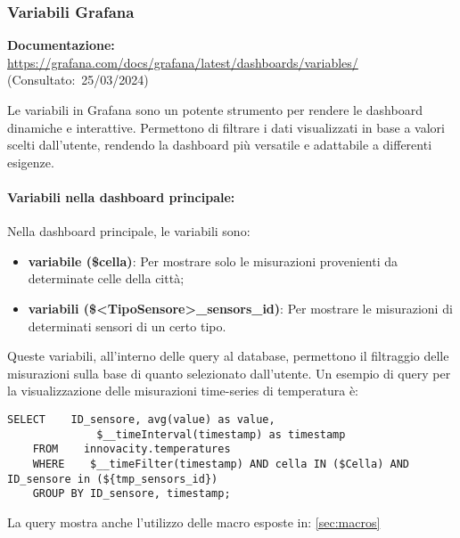 \subsubsection{Variabili Grafana}
\textbf{Documentazione:}
\url{https://grafana.com/docs/grafana/latest/dashboards/variables/} (Consultato:~25/03/2024)


Le variabili in Grafana sono un potente strumento per rendere le dashboard dinamiche e interattive. Permettono di filtrare i dati visualizzati in base a valori scelti dall'utente, rendendo la dashboard più versatile e adattabile a differenti esigenze.
\paragraph*{Variabili nella dashboard principale:}
Nella dashboard principale, le variabili sono:
\begin{itemize}
    \item \textbf{variabile (\$cella)}: Per mostrare solo le misurazioni provenienti da determinate celle della città;
    \item \textbf{variabili (\$<TipoSensore>\_sensors\_id)}: Per mostrare le misurazioni di determinati sensori di un certo tipo.
\end{itemize}
Queste variabili, all'interno delle query al database, permettono il filtraggio delle misurazioni sulla base di quanto selezionato dall'utente.
Un esempio di query per la visualizzazione delle misurazioni time-series di temperatura è:
\begin{lstlisting}[style=code]
    SELECT    ID_sensore, avg(value) as value,
              $__timeInterval(timestamp) as timestamp
    FROM    innovacity.temperatures 
    WHERE    $__timeFilter(timestamp) AND cella IN ($Cella) AND ID_sensore in (${tmp_sensors_id})
    GROUP BY ID_sensore, timestamp;
\end{lstlisting}

La query mostra anche l'utilizzo delle macro esposte in: \ref{sec:macros}

